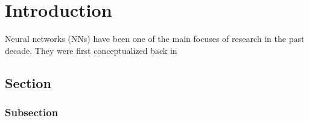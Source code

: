 
\chapter{Introduction}\label{chapter:introduction}








Neural networks (NNs) have been one of the main focuses of research in the past decade.
They were first conceptualized back in 

\section{Section}


\subsection{Subsection}
